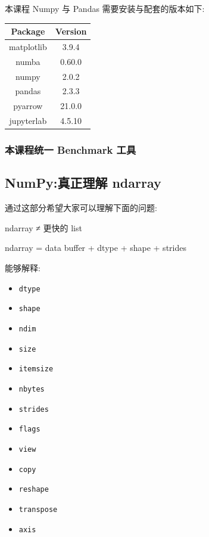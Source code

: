 \documentclass[11pt]{article}
\providecommand{\tightlist}{%
      \setlength{\itemsep}{0pt}\setlength{\parskip}{0pt}}
\newenvironment{Shaded}{}{}
\newcommand{\NormalTok}[1]{{#1}}
\begin{document}
    本课程 Numpy 与 Pandas 需要安装与配套的版本如下:

{\def\LTcaptype{none} %
\begin{longtable}[]{@{}cc@{}}
\toprule\noalign{}
Package & Version \\
\midrule\noalign{}
\endhead
\bottomrule\noalign{}
\endlastfoot
matplotlib & 3.9.4 \\
numba & 0.60.0 \\
numpy & 2.0.2 \\
pandas & 2.3.3 \\
pyarrow & 21.0.0 \\
jupyterlab & 4.5.10 \\
\end{longtable}
}

    \subsubsection{本课程统一 Benchmark
工具}\label{ux672cux8bfeux7a0bux7edfux4e00-benchmark-ux5de5ux5177}

    \subsection{NumPy:真正理解
ndarray}\label{numpyux771fux6b63ux7406ux89e3-ndarray}

    通过这部分希望大家可以理解下面的问题:

\begin{Shaded}
\begin{Highlighting}[]
\NormalTok{ndarray ≠ 更快的 list}

\NormalTok{ndarray =}
\NormalTok{    data buffer}
\NormalTok{    + dtype}
\NormalTok{    + shape}
\NormalTok{    + strides}
\end{Highlighting}
\end{Shaded}

能够解释:

\begin{itemize}
\tightlist
\item
  \texttt{dtype}
\item
  \texttt{shape}
\item
  \texttt{ndim}
\item
  \texttt{size}
\item
  \texttt{itemsize}
\item
  \texttt{nbytes}
\item
  \texttt{strides}
\item
  \texttt{flags}
\item
  \texttt{view}
\item
  \texttt{copy}
\item
  \texttt{reshape}
\item
  \texttt{transpose}
\item
  \texttt{axis}
\end{itemize}
\end{document}
